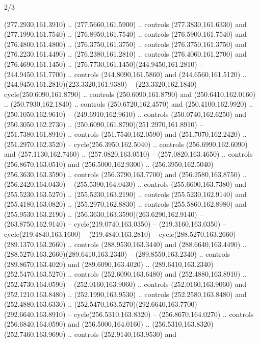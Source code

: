 \begin{flagdescription}{2/3}
\begin{scope}[xshift=0.5\flaglength,yshift=0.5\flagwidth,scale=\flagwidth/259.2]
\begin{scope}[y=0.8pt, x=0.8pt, yscale=-1,shift={(-243,-162)}]
      (277.2930,161.3910) .. (277.5660,161.5900) .. controls (277.3830,161.6330) and
      (277.1990,161.7540) .. (276.8950,161.7540) .. controls (276.5900,161.7540) and
      (276.4800,161.4800) .. (276.3750,161.3750) .. controls (276.3750,161.3750) and
      (276.2230,161.4490) .. (276.2380,161.2810) .. controls (276.4060,161.2700) and
      (276.4690,161.1450) .. (276.7730,161.1450)(244.9450,161.2810) --
      (244.9450,161.7700) .. controls (244.8090,161.5860) and (244.6560,161.5120) ..
      (244.9450,161.2810)(223.3320,161.9380) -- (223.3320,162.1840) --
      cycle(250.6090,161.8790) .. controls (250.6090,161.8790) and
      (250.6410,162.0160) .. (250.7930,162.1840) .. controls (250.6720,162.4570) and
      (250.4100,162.9920) .. (250.1050,162.9610) -- (249.6910,162.9610) .. controls
      (250.0740,162.6250) and (250.3050,162.2730) ..
      (250.6090,161.8790)(251.2970,161.8910) -- (251.7380,161.8910) .. controls
      (251.7540,162.0590) and (251.7070,162.2420) .. (251.2970,162.3520) --
      cycle(256.3950,162.5040) .. controls (256.6990,162.6090) and
      (257.1130,162.7460) .. (257.0820,163.0510) -- (257.0820,163.4650) .. controls
      (256.8670,163.0510) and (256.5000,162.9300) ..
      (256.3950,162.5040)(256.3630,163.3590) .. controls (256.3790,163.7700) and
      (256.2580,163.8750) .. (256.2420,164.0430) -- (255.5390,164.0430) .. controls
      (255.6600,163.7380) and (255.5230,163.5270) .. (255.5230,163.2190) .. controls
      (255.5230,162.9140) and (255.4180,163.0820) .. (255.2970,162.8830) .. controls
      (255.5860,162.8980) and (255.9530,163.2190) ..
      (256.3630,163.3590)(263.6290,162.9140) -- (263.8750,162.9140) --
      cycle(219.0740,163.0350) -- (219.3160,163.0350) -- cycle(219.4840,163.1600) --
      (219.4840,163.2810) -- cycle(288.5270,163.2660) -- (289.1370,163.2660) ..
      controls (288.9530,163.3440) and (288.6640,163.4490) ..
      (288.5270,163.2660)(289.6410,163.2340) -- (289.8550,163.2340) .. controls
      (289.8670,163.4020) and (289.6090,163.4020) ..
      (289.6410,163.2340)(252.5470,163.5270) .. controls (252.6090,163.6480) and
      (252.4880,163.8910) .. (252.4730,164.0590) -- (252.0160,163.9060) .. controls
      (252.0160,163.9060) and (252.1210,163.8480) .. (252.1990,163.9530) .. controls
      (252.2580,163.8480) and (252.4880,163.6330) ..
      (252.5470,163.5270)(292.6640,163.7700) -- (292.6640,163.8910) --
      cycle(256.5310,163.8320) -- (256.8670,164.0270) .. controls
      (256.6840,164.0590) and (256.5000,164.0160) ..
      (256.5310,163.8320)(252.7460,163.9690) .. controls (252.9140,163.9530) and

\end{scope}
\end{scope}
\end{flagdescription}

